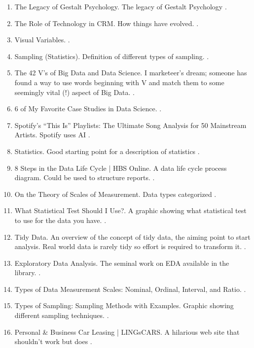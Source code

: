 \documentclass[a4paper]{article}
\begin{document}
\begin{enumerate}
\item The Legacy of Gestalt Psychology. The legacy of Gestalt Psychology \parencite{rockLegacyGestaltPsychology1990}.
\item The Role of Technology in CRM. How things have evolved. \parencite{RoleTechnologyCRM}.
\item Visual Variables.  \parencite{rothVisualVariables2017}.
\item Sampling (Statistics). Definition of different types of sampling. \parencite{SamplingStatistics2022}.
\item The 42 V's of Big Data and Data Science. I marketeer’s dream; someone has found a way to use words beginning with V and match them to some seemingly vital (!) aspect of Big Data. \parencite{says42BigData}.
\item 6 of My Favorite Case Studies in Data Science.  \parencite{smithMyFavoriteCase2018}.
\item Spotify’s “This Is” Playlists: The Ultimate Song Analysis for 50 Mainstream Artists. Spotify uses AI \parencite{SpotifyThisPlaylists2018}.
\item Statistics. Good starting point for a description of statistics \parencite{Statistics2022}.
\item 8 Steps in the Data Life Cycle | HBS Online. A data life cycle process diagram. Could be used to structure reports. \parencite{StepsDataLife2021}.
\item On the Theory of Scales of Measurement. Data types categorized \parencite{stevensTheoryScalesMeasurement1946}.
\item What Statistical Test Should I Use?. A graphic showing what statistical test to use for the data you have. \parencite{teamWhatStatisticalTest2021}.
\item Tidy Data. An overview of the concept of tidy data, the aiming point to start analysis. Real world data is rarely tidy so effort is required to transform it. \parencite{TidyData}.
\item Exploratory Data Analysis. The seminal work on EDA available in the library. \parencite{tukey1977exploratory}.
\item Types of Data Measurement Scales: Nominal, Ordinal, Interval, and Ratio.  \parencite{TypesDataMeasurement2012}.
\item Types of Sampling: Sampling Methods with Examples. Graphic showing different sampling techniques. \parencite{TypesSamplingSampling2018}.
\item Personal \& Business Car Leasing | LINGsCARS. A hilarious web site that shouldn't work but does \parencite{valentinePersonalBusinessCar2022}.

\end{enumerate}
\end{document}
